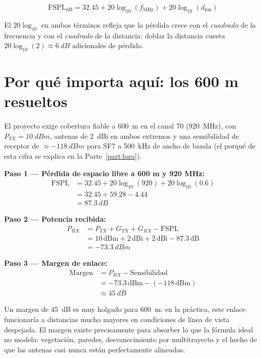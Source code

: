 \begin{equation}
  \text{FSPL}_{\text{dB}} = 32.45 + 20 \log_{10}(f_{\text{MHz}}) + 20 \log_{10}(d_{\text{km}})
  \label{eq:fspl}
\end{equation}

El $20\log_{10}$ en ambos términos refleja que la pérdida crece con el \emph{cuadrado} de la
frecuencia y con el \emph{cuadrado} de la distancia: doblar la distancia cuesta
$20\log_{10}(2) \approx \SI{6}{dB}$ adicionales de pérdida.

\section{Por qué importa aquí: los 600 m resueltos}

El proyecto exige cobertura fiable a \SI{600}{m} en el canal 70 (\SI{920}{MHz}), con
$P_{TX} = \SI{10}{dBm}$, antenas de \SI{2}{dBi} en ambos extremos y una sensibilidad de
receptor de $\approx \SI{-118}{dBm}$ para SF7 a \SI{500}{kHz} de ancho de banda (el porqué de
esta cifra se explica en la Parte~\ref{part:lora}).

\begin{ejemplo}
\textbf{Paso 1 — Pérdida de espacio libre a 600 m y 920 MHz:}
\begin{align*}
  \text{FSPL} &= 32.45 + 20\log_{10}(920) + 20\log_{10}(0.6) \\
              &= 32.45 + 59.28 - 4.44 \\
              &= \SI{87.3}{dB}
\end{align*}

\textbf{Paso 2 — Potencia recibida:}
\begin{align*}
  P_{RX} &= P_{TX} + G_{TX} + G_{RX} - \text{FSPL} \\
         &= 10\,\text{dBm} + 2\,\text{dBi} + 2\,\text{dBi} - 87.3\,\text{dB} \\
         &= \SI{-73.3}{dBm}
\end{align*}

\textbf{Paso 3 — Margen de enlace:}
\begin{align*}
  \text{Margen} &= P_{RX} - \text{Sensibilidad} \\
                &= -73.3\,\text{dBm} - (-118\,\text{dBm}) \\
                &\approx \SI{45}{dB}
\end{align*}
\end{ejemplo}

Un margen de \SI{45}{dB} es muy holgado para \SI{600}{m}: en la práctica, este enlace
funcionaría a distancias mucho mayores en condiciones de línea de vista despejada. El margen
existe precisamente para absorber lo que la fórmula ideal no modela: vegetación, paredes,
desvanecimiento por multitrayecto y el hecho de que las antenas casi nunca están perfectamente
alineadas.

